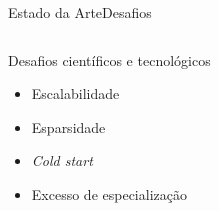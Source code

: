 
\begin{frame}{Estado da Arte}{Desafios}
\begin{columns}[c]

\begin{block}{Desafios científicos e tecnológicos}
\begin{itemize}
	\item Escalabilidade
	\item Esparsidade
	\item \textit{Cold start}
	\item Excesso de especialização
\end{itemize}
\end{block}

\end{columns}
\end{frame}
